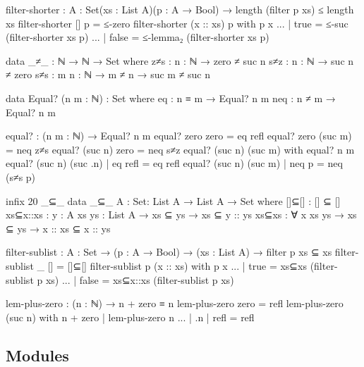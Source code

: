 \begin{code}
filter-shorter : {A : Set}(xs : List A)(p : A → Bool) → length (filter p xs) ≤ length xs
filter-shorter []        p = ≤-zero
filter-shorter (x :: xs) p with p x
... | true = ≤-suc (filter-shorter xs p)
... | false = ≤-lemma₂ (filter-shorter xs p)

data _≠_ : ℕ → ℕ → Set where
  z≠s : {n : ℕ} → zero ≠ suc n
  s≠z : {n : ℕ} → suc n ≠ zero
  s≠s : {m n : ℕ} → m ≠ n → suc m ≠ suc n

data Equal? (n m : ℕ) : Set where
  eq : n ≡ m → Equal? n m
  neq : n ≠ m → Equal? n m

equal? : (n m : ℕ) → Equal? n m
equal? zero zero = eq refl
equal? zero (suc m) = neq z≠s
equal? (suc n) zero = neq s≠z
equal? (suc n) (suc m) with equal? n m
equal? (suc n) (suc .n) | eq refl = eq refl
equal? (suc n) (suc m)  | neq p = neq (s≠s p)

infix 20 _⊆_
data _⊆_ {A : Set}: List A → List A → Set where
  []⊆[] : [] ⊆ []
  xs⊆x::xs : {y : A} {xs ys : List A} → xs ⊆ ys → xs ⊆ y :: ys
  xs⊆xs : ∀ {x xs ys} → xs ⊆ ys → x :: xs ⊆ x :: ys

filter-sublist : {A : Set}
  → (p : A → Bool)
  → (xs : List A)
  → filter p xs ⊆ xs 
filter-sublist _ [] = []⊆[]
filter-sublist p (x :: xs) with p x
... | true = xs⊆xs (filter-sublist p xs)
... | false = xs⊆x::xs (filter-sublist p xs)

lem-plus-zero : (n : ℕ) → n + zero ≡ n
lem-plus-zero zero = refl
lem-plus-zero (suc n) with n + zero | lem-plus-zero n
... | .n | refl = refl
\end{code}

\subsection{Modules}

